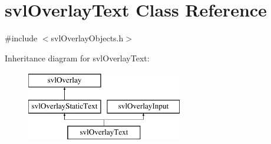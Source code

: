 \hypertarget{classsvl_overlay_text}{\section{svl\-Overlay\-Text Class Reference}
\label{classsvl_overlay_text}
}


{\ttfamily \#include $<$svl\-Overlay\-Objects.\-h$>$}

Inheritance diagram for svl\-Overlay\-Text\-:\begin{figure}[H]
\begin{center}
\leavevmode
\includegraphics[height=3.000000cm]{d5/de6/classsvl_overlay_text}
\end{center}
\end{figure}
